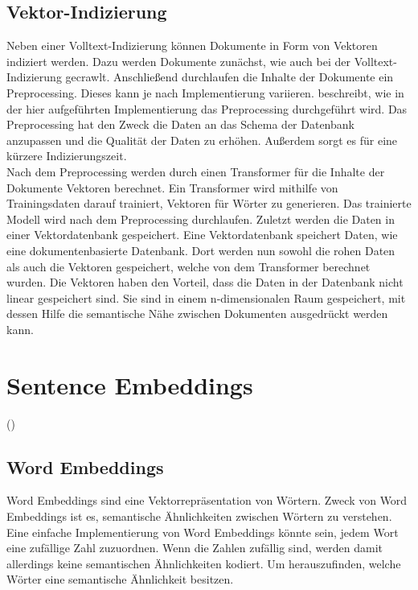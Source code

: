\subsection{Vektor-Indizierung}
\label{chap:vektorindizes}
Neben einer Volltext-Indizierung können Dokumente in Form von Vektoren indiziert werden.
Dazu werden Dokumente zunächst, wie auch bei der Volltext-Indizierung gecrawlt.
Anschließend durchlaufen die Inhalte der Dokumente ein Preprocessing.
Dieses kann je nach Implementierung variieren.
 beschreibt, wie in der hier aufgeführten Implementierung das Preprocessing durchgeführt wird.
Das Preprocessing hat den Zweck die Daten an das Schema der Datenbank anzupassen und die Qualität der Daten zu erhöhen.
Außerdem sorgt es für eine kürzere Indizierungszeit.\\

Nach dem Preprocessing werden durch einen Transformer für die Inhalte der Dokumente Vektoren berechnet.
Ein Transformer wird mithilfe von Trainingsdaten darauf trainiert, Vektoren für Wörter zu generieren.
Das trainierte Modell wird nach dem Preprocessing durchlaufen.
Zuletzt werden die Daten in einer Vektordatenbank gespeichert.
Eine Vektordatenbank speichert Daten, wie eine dokumentenbasierte Datenbank.
Dort werden nun sowohl die rohen Daten als auch die Vektoren gespeichert, welche von dem Transformer berechnet wurden.
Die Vektoren haben den Vorteil, dass die Daten in der Datenbank nicht linear gespeichert sind.
Sie sind in einem n-dimensionalen Raum gespeichert, mit dessen Hilfe die semantische Nähe zwischen Dokumenten ausgedrückt werden kann.

\section{Sentence Embeddings}
\label{chap:sentence-embeddings}
 (\cite{Reimers_Gurevych_2019})

\subsection{Word Embeddings}
Word Embeddings sind eine Vektorrepräsentation von Wörtern.
Zweck von Word Embeddings ist es, semantische Ähnlichkeiten zwischen Wörtern zu verstehen.
Eine einfache Implementierung von Word Embeddings könnte sein, jedem Wort eine zufällige Zahl zuzuordnen.
Wenn die Zahlen zufällig sind, werden damit allerdings keine semantischen Ähnlichkeiten kodiert.
Um herauszufinden, welche Wörter eine semantische Ähnlichkeit besitzen.

